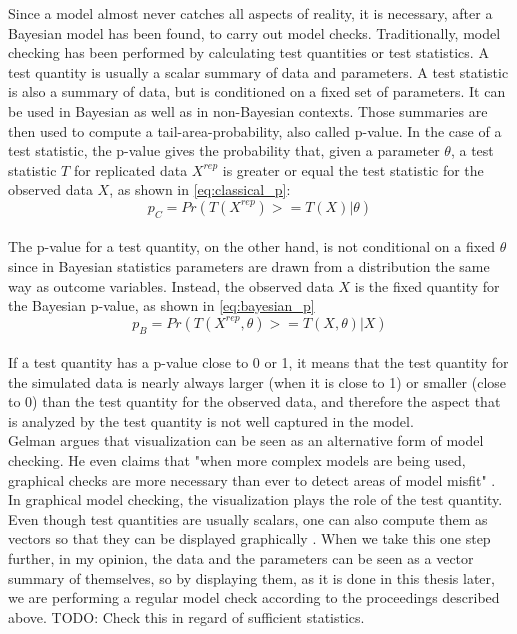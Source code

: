 \documentclass{article}
\begin{document}
Since a model almost never catches all aspects of reality, it is necessary, after a Bayesian model has been found, to carry out model checks. Traditionally, model checking has been performed by calculating test quantities or test statistics. A test quantity is usually a scalar summary of data and parameters. A test statistic is also a summary of data, but is conditioned on a fixed set of parameters. It can be used in Bayesian as well as in non-Bayesian contexts. Those summaries are then used to compute a tail-area-probability, also called p-value. In the case of a test statistic, the p-value gives the probability that, given a parameter $\theta$, a test statistic $T$ for replicated data $X^{rep}$ is greater or equal the test statistic  for the observed data $X$, as shown in \autoref{eq:classical_p}:
\begin{equation}
p_C = Pr(T(X^{rep}) >= T(X) | \theta)
\label{eq:classical_p}
\end{equation}
\cite{1439840954}\\
The p-value for a test quantity, on the other hand, is not conditional on a fixed $\theta$ since in Bayesian statistics parameters are drawn from a distribution the same way as outcome variables. Instead, the observed data $X$ is the fixed quantity for the Bayesian p-value, as shown in \autoref{eq:bayesian_p}
\begin{equation}
p_B = Pr(T(X^{rep},\theta) >= T(X,\theta) | X)
\label{eq:bayesian_p}
\end{equation}
\cite{1439840954}\\
If a test quantity has a p-value close to 0 or 1, it means that the test quantity for the simulated data is nearly always larger (when it is close to 1) or smaller (close to 0) than the test quantity for the observed data, and therefore the aspect that is analyzed by the test quantity is not well captured in the model.\\
Gelman \cite{gelman2004exploratory} argues that visualization can be seen as an alternative form of model checking. He even claims that "when more complex models are being used, graphical checks are more necessary than ever to detect areas of model misfit" \cite{gelman2004exploratory}. In graphical model checking, the visualization plays the role of the test quantity. Even though test quantities are usually scalars, one can also compute them as vectors so that they can be displayed graphically \cite{gelman2004exploratory}. When we take this one step further, in my opinion, the data and the parameters can be seen as a vector summary of themselves, so by displaying them, as it is done in this thesis later, we are performing a regular model check according to the proceedings described above. TODO: Check this in regard of sufficient statistics.
\end{document}
